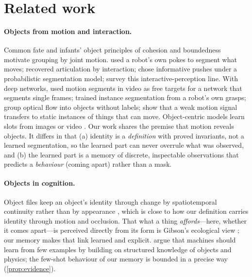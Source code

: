\documentclass[10pt]{article}
\begin{document}
\section{Related work}
\label{sec:related}

\paragraph{Objects from motion and interaction.}
Common fate \citep{wertheimer1923} and infants' object principles of cohesion and boundedness \citep{spelke1990principles} motivate grouping by joint motion. \citet{metta2003better} used a robot's own pokes to segment what moves; \citet{katz2008manipulating} recovered articulation by interaction; \citet{vanhoof2014probabilistic} chose informative pushes under a probabilistic segmentation model; \citet{bohg2017interactive} survey this interactive-perception line. With deep networks, \citet{pathak2017watching} used motion segments in video as free targets for a network that segments single frames; \citet{pathak2018interaction} trained instance segmentation from a robot's own grasps; \citet{yang2021motiongroup} group optical flow into objects without labels; \citet{bao2022discovering} show that a weak motion signal transfers to static instances of things that can move. Object-centric models learn slots from images or video \citep{locatello2020slot,kipf2022savi}. Our work shares the premise that motion reveals objects. It differs in that (a) identity is a \emph{definition} with proved invariants, not a learned segmentation, so the learned part can never overrule what was observed, and (b) the learned part is a memory of discrete, inspectable observations that predicts a \emph{behaviour} (coming apart) rather than a mask.

\paragraph{Objects in cognition.}
Object files keep an object's identity through change by spatiotemporal continuity rather than by appearance \citep{kahneman1992objectfiles}, which is close to how our definition carries identity through motion and occlusion. That what a thing \emph{affords}---here, whether it comes apart---is perceived directly from its form is Gibson's ecological view \citep{gibson1979ecological}; our memory makes that link learned and explicit. \citet{lake2017building} argue that machines should learn from few examples by building on structured knowledge of objects and physics; the few-shot behaviour of our memory is bounded in a precise way (\cref{prop:evidence}).
\end{document}
